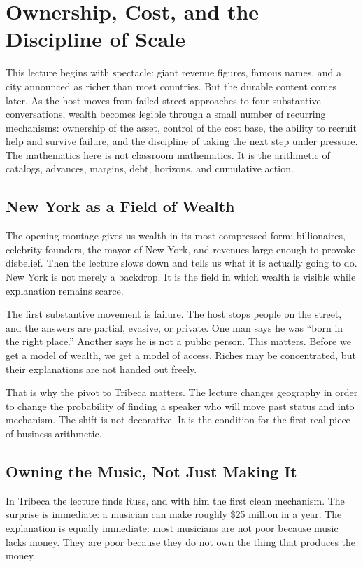 \chapter{Ownership, Cost, and the Discipline of Scale}

This lecture begins with spectacle: giant revenue figures, famous names, and a city announced as richer than most countries. But the durable content comes later. As the host moves from failed street approaches to four substantive conversations, wealth becomes legible through a small number of recurring mechanisms: ownership of the asset, control of the cost base, the ability to recruit help and survive failure, and the discipline of taking the next step under pressure. The mathematics here is not classroom mathematics. It is the arithmetic of catalogs, advances, margins, debt, horizons, and cumulative action.

\section{New York as a Field of Wealth}

The opening montage gives us wealth in its most compressed form: billionaires, celebrity founders, the mayor of New York, and revenues large enough to provoke disbelief. Then the lecture slows down and tells us what it is actually going to do. New York is not merely a backdrop. It is the field in which wealth is visible while explanation remains scarce.

The first substantive movement is failure. The host stops people on the street, and the answers are partial, evasive, or private. One man says he was ``born in the right place.'' Another says he is not a public person. This matters. Before we get a model of wealth, we get a model of access. Riches may be concentrated, but their explanations are not handed out freely.

That is why the pivot to Tribeca matters. The lecture changes geography in order to change the probability of finding a speaker who will move past status and into mechanism. The shift is not decorative. It is the condition for the first real piece of business arithmetic.

\section{Owning the Music, Not Just Making It}

In Tribeca the lecture finds Russ, and with him the first clean mechanism. The surprise is immediate: a musician can make roughly \$25 million in a year. The explanation is equally immediate: most musicians are not poor because music lacks money. They are poor because they do not own the thing that produces the money.

